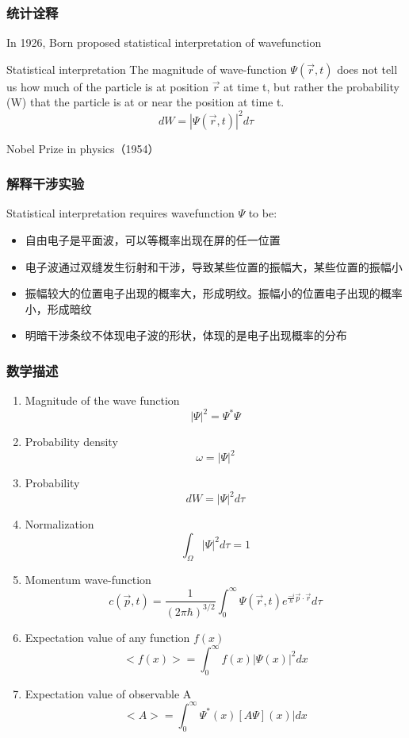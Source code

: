 \begin{frame}
    \frametitle{统计诠释}
    In 1926, Born proposed statistical interpretation of wavefunction
    \begin{tcolorbox1}{Statistical interpretation}
        The magnitude of wave-function $\Psi(\vec{r},t)$ does not tell us how much of 
        the particle is at position $\vec{r}$ at time t, 
        but rather the probability (W) that the particle is at or near the position at time t. \\
        \[ d W = |\Psi(\vec{r},t)|^2 d \tau \]
    \end{tcolorbox1}
    {\color{deepred} Nobel Prize in physics（1954）}
\end{frame}

\begin{frame}
    \frametitle{解释干涉实验}
    Statistical interpretation requires wavefunction $\Psi$ to be:
    \begin{itemize}
        \item 自由电子是平面波，可以等概率出现在屏的任一位置
        \item 电子波通过双缝发生衍射和干涉，导致某些位置的振幅大，某些位置的振幅小
        \item 振幅较大的位置电子出现的概率大，形成明纹。振幅小的位置电子出现的概率小，形成暗纹
        \item 明暗干涉条纹不体现电子波的形状，体现的是电子出现概率的分布
    \end{itemize}  
\end{frame}

\begin{frame}[allowframebreaks=]
    \frametitle{数学描述}
    \begin{enumerate}
        \item Magnitude of the wave function \[|\Psi|^2 =\Psi^* \Psi \]
        \item Probability density \[\omega = |\Psi|^2 \]
        \item Probability  \[ d W = |\Psi|^2 d \tau \]
        \item Normalization \[ \int_{\Omega} |\Psi|^2 d \tau =1 \]
        \item Momentum wave-function \[ c(\vec{p},t)=\frac{1}{(2\pi\hbar)^{3/2}} \int_{0}^{\infty} \Psi(\vec{r},t) e^{\frac{-i}{\hbar} \vec{p}\cdot \vec{r} } d \tau \] 
        \item Expectation value of any function $f (x)$  \[ <f(x)>=\int_{0}^{\infty} f(x) |\Psi(x)|^2 dx \]
        \item Expectation value of observable A \[ <A>=\int_{0}^{\infty} \Psi^*(x) [A \Psi](x)| dx \]
    \end{enumerate}
\end{frame}

